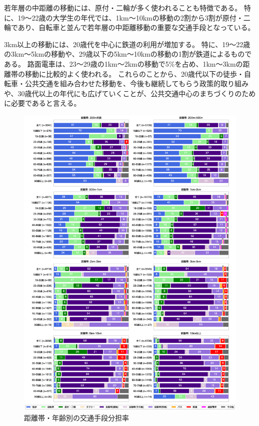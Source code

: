 \documentclass[a4paper,12pt, uplatex]{jsbook}
\begin{document}
若年層の中距離の移動には、原付・二輪が多く使われることも特徴である。
特に、19〜22歳の大学生の年代では、1km〜10kmの移動の2割から3割が原付・二輪であり、自転車と並んで若年層の中距離移動の重要な交通手段となっている。

3km以上の移動には、20歳代を中心に鉄道の利用が増加する。
特に、19〜22歳の3km〜5kmの移動や、29歳以下の5km〜10kmの移動の1割が鉄道によるものである。
路面電車は、23〜29歳の1km〜2kmの移動で5\%を占め、1km〜3kmの距離帯の移動に比較的よく使われる。
これらのことから、20歳代以下の徒歩・自転車・公共交通を組み合わせた移動を、今後も継続してもらう政策的取り組みや、30歳代以上の年代にも広げていくことが、公共交通中心のまちづくりのために必要であると言える。


\begin{figure}[htbp]
    \centering
    \includegraphics[width=1.0\textwidth]{picture/mode_share_age_dist.eps}
    \caption{距離帯・年齢別の交通手段分担率}
    \label{fig:mode_share_dist}
\end{figure}
\end{document}
